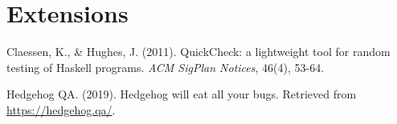 \documentclass{scrartcl}
\begin{document}

\section{Extensions}


\begin{thebibliography}{99}

Claessen, K., \& Hughes, J. (2011). QuickCheck: a lightweight tool for random
testing of Haskell programs. \textit{ACM SigPlan Notices}, 46(4), 53-64.

Hedgehog QA. (2019). Hedgehog will eat all your bugs. Retrieved from
\url{https://hedgehog.qa/}.

\end{thebibliography}
\end{document}
